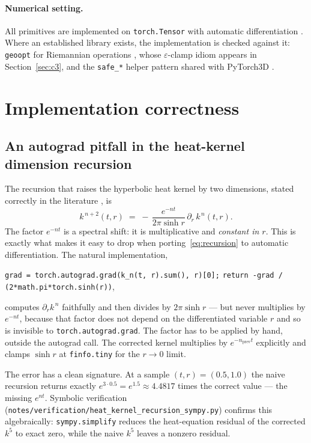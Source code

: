\documentclass{article}
\newcommand{\code}[1]{\texttt{#1}}
\begin{document}
\paragraph{Numerical setting.} All primitives are implemented on
\code{torch.Tensor} with automatic differentiation
\citep{paszke2019pytorch}. Where an established library exists, the
implementation is checked against it: \code{geoopt} for Riemannian operations
\citep{kochurov2020geoopt}, whose $\varepsilon$-clamp idiom appears in
Section~\ref{sec:c3}, and the \code{safe\_*} helper pattern shared with
PyTorch3D \citep{ravi2020pytorch3d}.

\section{Implementation correctness}
\label{sec:correctness}

\subsection{An autograd pitfall in the heat-kernel dimension recursion}
\label{sec:c1}

The recursion that raises the hyperbolic heat kernel by two dimensions,
stated correctly in the literature
\citep{grigoryan1998heat,grigoryan2009heat,yu2018heat}, is
\begin{equation}
  k^{\,n+2}(t, r) \;=\; -\,\frac{e^{-n t}}{2\pi \sinh r}\,
  \partial_r\, k^{\,n}(t, r).
  \label{eq:recursion}
\end{equation}
The factor $e^{-n t}$ is a spectral shift: it is multiplicative and
\emph{constant in $r$}. This is exactly what makes it easy to drop when
porting~\eqref{eq:recursion} to automatic differentiation. The natural
implementation,
\begin{center}
\code{grad = torch.autograd.grad(k\_n(t, r).sum(), r)[0];}\quad
\code{return -grad / (2*math.pi*torch.sinh(r))},
\end{center}
computes $\partial_r k^{\,n}$ faithfully and then divides by
$2\pi \sinh r$ --- but never multiplies by $e^{-nt}$, because that factor
does not depend on the differentiated variable $r$ and so is invisible
to \code{torch.autograd.grad}. The factor has to be applied by hand,
outside the autograd call. The corrected kernel multiplies by
$e^{-n_{\text{prev}} t}$ explicitly and clamps $\sinh r$ at
\code{finfo.tiny} for the $r \to 0$ limit.

The error has a clean signature. At a sample $(t, r) = (0.5, 1.0)$ the
naive recursion returns exactly $e^{3 \cdot 0.5} = e^{1.5} \approx 4.4817$
times the correct value --- the missing $e^{nt}$. Symbolic verification
(\code{notes/verification/heat\_kernel\_recursion\_sympy.py}) confirms
this algebraically: \code{sympy.simplify} reduces the heat-equation
residual of the corrected $k^5$ to exact zero, while the naive $k^5$
leaves a nonzero residual.
\end{document}

